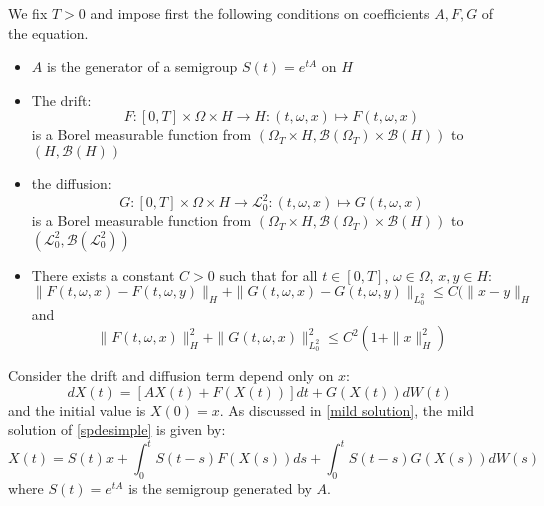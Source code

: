 \begin{theorem}[Hypothesis]
    We fix $T > 0$ and impose first the following conditions on coefficients $A, F, G$ of the equation.
    \begin{itemize}
        \item $A$ is the generator of a semigroup $S(t)=e^{tA}$ on $H$
        \item The drift:
        \begin{equation}
            F: [0, T] \times \Omega \times H \rightarrow H: (t, \omega, x) \mapsto F(t, \omega, x)
        \end{equation}
        is a Borel measurable function from $(\Omega_T\times H, \mathcal{B}(\Omega_T)\times \mathcal{B}(H))$ to $(H, \mathcal{B}(H))$
        \item the diffusion:
        \begin{equation}
            G: [0, T] \times \Omega \times H \rightarrow \mathcal{L}_0^2: (t, \omega, x) \mapsto G(t, \omega, x)
        \end{equation}
        is a Borel measurable function from $(\Omega_T\times H, \mathcal{B}(\Omega_T)\times \mathcal{B}(H))$ to $(\mathcal{L}_0^2, \mathcal{B}(\mathcal{L}_0^2))$
        \item There exists a constant $C > 0$ such that for all $t\in [0, T]$, $\omega \in \Omega$, $x, y\in H$:
        \begin{equation}
            \|F(t, \omega, x) - F(t, \omega, y)\|_{H} + \|G(t, \omega, x) - G(t, \omega, y)\|_{L_0^2} \leq C(\|x-y\|_{H}
        \end{equation}
        and 
        \begin{equation}
            \|F(t, \omega, x)\|^2_{H} + \|G(t, \omega, x)\|^2_{L_0^2} \leq C^2(1+\|x\|^2_{H})
        \end{equation}
    \end{itemize}
\end{theorem}

Consider the drift and diffusion term depend only on $x$:
\begin{equation}\label{spdesimple}
    dX(t) = [AX(t) + F(X(t))]dt + G(X(t))dW(t)
\end{equation}
and the initial value is $X(0) = x$. As discussed in \ref{mild solution}, the mild solution of \ref{spdesimple} is given by:
\begin{equation}
    X(t) = S(t)x + \int_0^t S(t-s)F(X(s))ds + \int_0^t S(t-s)G(X(s))dW(s)
\end{equation}
where $S(t) = e^{tA}$ is the semigroup generated by $A$.

